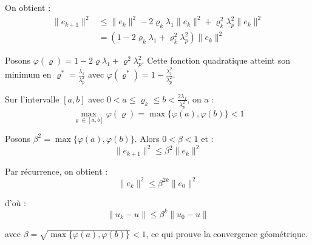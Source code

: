 {\begin{enumerate}
{On obtient :
\begin{align*}
\|e_{k+1}\|^2 &\leq \|e_k\|^2 - 2\varrho_k \lambda_1 \|e_k\|^2 + \varrho_k^2 \lambda_p^2 \|e_k\|^2\\
&= (1 - 2\varrho_k \lambda_1 + \varrho_k^2 \lambda_p^2)\|e_k\|^2
\end{align*}

Posons $\varphi(\varrho) = 1 - 2\varrho \lambda_1 + \varrho^2 \lambda_p^2$. Cette fonction quadratique atteint son minimum en $\varrho^* = \frac{\lambda_1}{\lambda_p^2}$ avec $\varphi(\varrho^*) = 1 - \frac{\lambda_1^2}{\lambda_p^2}$.

Sur l'intervalle $[a,b]$ avec $0 < a \leq \varrho_k \leq b < \frac{2\lambda_1}{\lambda_p^2}$, on a :
$$\max_{\varrho \in [a,b]} \varphi(\varrho) = \max\{\varphi(a), \varphi(b)\} < 1$$

Posons $\beta^2 = \max\{\varphi(a), \varphi(b)\}$. Alors $0 < \beta < 1$ et :
$$\|e_{k+1}\|^2 \leq \beta^2 \|e_k\|^2$$

Par récurrence, on obtient :
$$\|e_k\|^2 \leq \beta^{2k} \|e_0\|^2$$

d'où :
$$\boxed{\|u_k - u\| \leq \beta^k \|u_0 - u\|}$$

avec $\beta = \sqrt{\max\{\varphi(a), \varphi(b)\}} < 1$, ce qui prouve la convergence géométrique.

}
\end{enumerate}

}


















